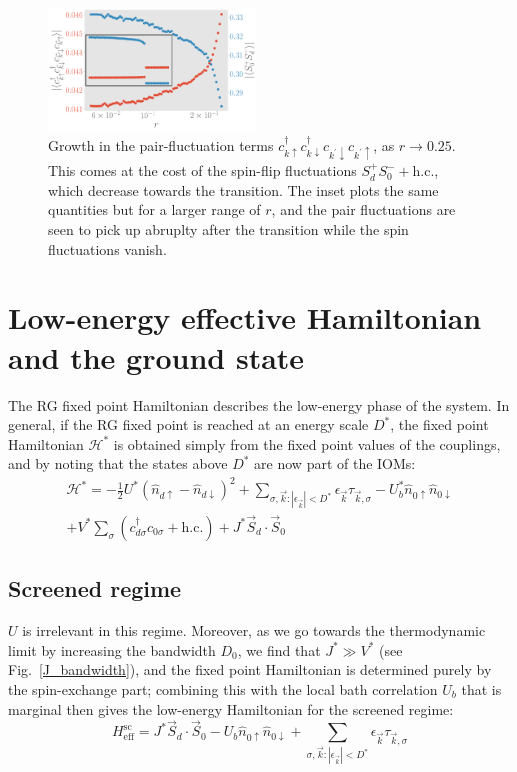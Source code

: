 \documentclass[reprint,superscriptaddress,floatfix]{revtex4-2}
\begin{document}
\begin{figure}[htpb]
	\centering
	\includegraphics[width=0.49\textwidth]{../figures/odlro.pdf}
	\caption{Growth in the pair-fluctuation terms \(c^\dagger_{k \uparrow}c^\dagger_{k \downarrow} c_{k^\prime \downarrow}c_{k^\prime \uparrow}\), as \(r \to 0.25\). This comes at the cost of the spin-flip fluctuations \(S_d^+ S_0^- + \text{h.c.}\), which decrease towards the transition. The inset plots the same quantities but for a larger range of \(r\), and the pair fluctuations are seen to pick up abruplty after the transition while the spin fluctuations vanish.}
	\label{pair_fluc}
\end{figure}



\section{Low-energy effective Hamiltonian and the ground state}

The RG fixed point Hamiltonian describes the low-energy phase of the system. In general, if the RG fixed point is reached at an energy scale \(D^*\), the fixed point Hamiltonian \(\mathcal{H}^*\) is obtained simply from the fixed point values of the couplings, and by noting that the states above \(D^*\) are now part of the IOMs:
\begin{equation}\begin{aligned}
	\mathcal{H}^* = -\frac{1}{2}U^*\left(\hat n_{d \uparrow} - \hat n_{d \downarrow}\right)^2 + \sum_{\sigma,\vec k:|\epsilon_{\vec k}| < D^*} \epsilon_{\vec k} \tau_{\vec k,\sigma} - U_b^* \hat n_{0 \uparrow} \hat n_{0 \downarrow} \\
	+ V^*\sum_\sigma \left( c^\dagger_{d\sigma}c_{0\sigma} + \text{h.c.}\right) + J^* \vec{S}_d\cdot\vec{S}_0
\end{aligned}\end{equation}

\subsection{Screened regime}
\(U\) is irrelevant in this regime. Moreover, as we go towards the thermodynamic limit by increasing the bandwidth \(D_0\), we find that \(J^* \gg V^*\) (see Fig.~\ref{J_bandwidth}), and the fixed point Hamiltonian is determined purely by the spin-exchange part; combining this with the local bath correlation \(U_b\) that is marginal then gives the low-energy Hamiltonian for the screened regime:
\begin{equation}
	H_\text{eff}^\text{sc} = J^* \vec{S}_d\cdot\vec{S}_0 - U_b \hat n_{0 \uparrow} \hat n_{0 \downarrow} + \sum_{\sigma,\vec k:|\epsilon_{\vec k}| < D^*} \epsilon_{\vec k} \tau_{\vec k,\sigma}
\end{equation}
\end{document}
